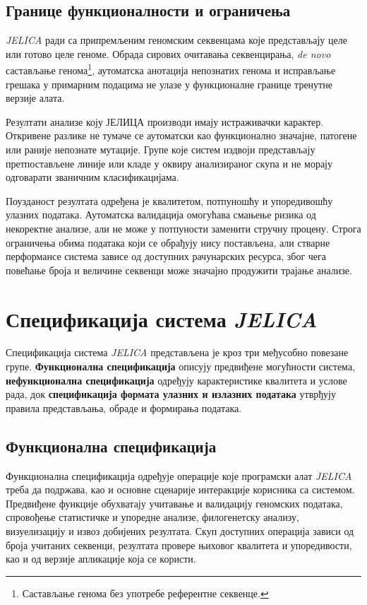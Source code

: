 \documentclass[12pt,oneside]{memoir}
\begin{document}
\subsection{Границе функционалности и ограничења}
\textit{JELICA} ради са припремљеним геномским секвенцама које представљају целе или готово целе геноме. Обрада сирових очитавања секвенцирања, \textit{de novo} састављање генома\footnote{Састављање генома без употребе референтне секвенце.}, аутоматска анотација непознатих генома и исправљање грешака у примарним подацима не улазе у функционалне границе тренутне верзије алата.

Резултати анализе коју ЈЕЛИЦА производи имају истраживачки карактер. Откривене разлике не тумаче се аутоматски као функционално значајне, патогене или раније непознате мутације. Групе које систем издвоји представљају претпостављене линије или кладе у оквиру анализираног скупа и не морају одговарати званичним класификацијама.

Поузданост резултата одређена је квалитетом, потпуношћу и упоредивошћу улазних података. Аутоматска валидација омогућава смањење ризика од некоректне анализе, али не може у потпуности заменити стручну процену. Строга ограничења обима података који се обрађују нису постављена, али стварне перформансе система зависе од доступних рачунарских ресурса, због чега повећање броја и величине секвенци може значајно продужити трајање анализе.


\section{Спецификација система \textit{JELICA}}
\setcounter{secnumdepth}{2}

Спецификација система \textit{JELICA} представљена је кроз три међусобно повезане групе. \textbf{Функционална спецификација} описују предвиђене могућности система, \textbf{нефункционална спецификација} одређују карактеристике квалитета и услове рада, док \textbf{спецификација формата улазних и излазних података} утврђују правила представљања, обраде и формирања података.


\subsection{Функционална спецификација}
Функционална спецификација одређује операције које програмски алат \textit{JELICA} треба да подржава, као и основне сценарије интеракције корисника са системом. Предвиђене функције обухватају учитавање и валидацију геномских података, спровођење статистичке и упоредне анализе, филогенетску анализу, визуелизацију и извоз добијених резултата. Скуп доступних операција зависи од броја учитаних секвенци, резултата провере њиховог квалитета и упоредивости, као и од верзије апликације која се користи.
\end{document}
